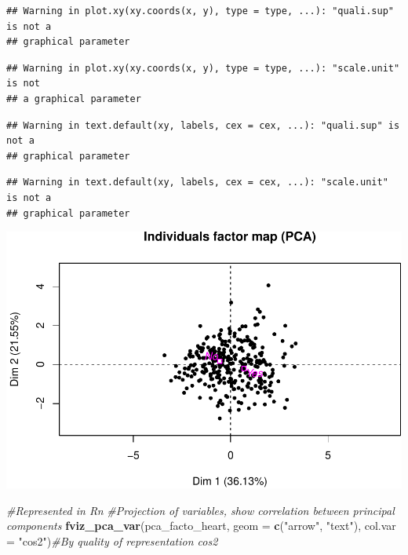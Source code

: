 \documentclass[]{article}
\newenvironment{Shaded}{\begin{snugshade}}{\end{snugshade}}
\newcommand{\KeywordTok}[1]{\textcolor[rgb]{0.13,0.29,0.53}{\textbf{#1}}}
\newcommand{\DataTypeTok}[1]{\textcolor[rgb]{0.13,0.29,0.53}{#1}}
\newcommand{\StringTok}[1]{\textcolor[rgb]{0.31,0.60,0.02}{#1}}
\newcommand{\CommentTok}[1]{\textcolor[rgb]{0.56,0.35,0.01}{\textit{#1}}}
\newcommand{\NormalTok}[1]{#1}
\begin{document}
\begin{verbatim}
## Warning in plot.xy(xy.coords(x, y), type = type, ...): "quali.sup" is not a
## graphical parameter
\end{verbatim}

\begin{verbatim}
## Warning in plot.xy(xy.coords(x, y), type = type, ...): "scale.unit" is not
## a graphical parameter
\end{verbatim}

\begin{verbatim}
## Warning in text.default(xy, labels, cex = cex, ...): "quali.sup" is not a
## graphical parameter
\end{verbatim}

\begin{verbatim}
## Warning in text.default(xy, labels, cex = cex, ...): "scale.unit" is not a
## graphical parameter
\end{verbatim}

\includegraphics{project_report_files/figure-latex/unnamed-chunk-9-2.pdf}

\begin{Shaded}
\begin{Highlighting}[]
\CommentTok{#Represented in Rn}
\CommentTok{#Projection of variables, show correlation between principal components}
\KeywordTok{fviz_pca_var}\NormalTok{(pca_facto_heart, }\DataTypeTok{geom =} \KeywordTok{c}\NormalTok{(}\StringTok{"arrow"}\NormalTok{, }\StringTok{"text"}\NormalTok{), }\DataTypeTok{col.var =} \StringTok{"cos2"}\NormalTok{)}\CommentTok{#By quality of representation cos2}
\end{Highlighting}
\end{Shaded}
\end{document}
